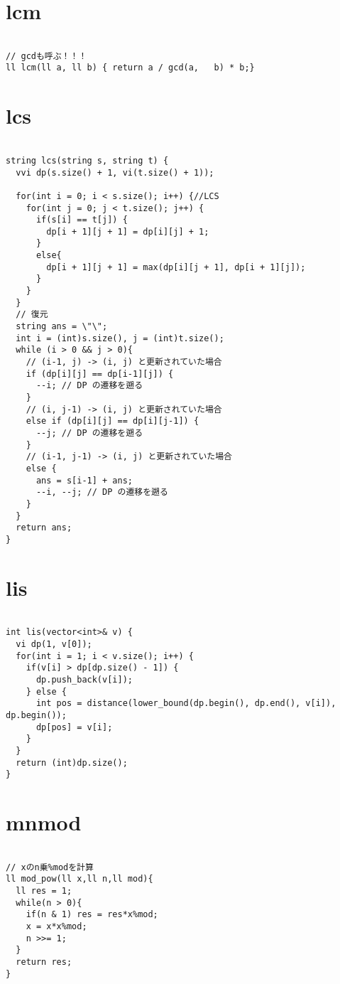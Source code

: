 \documentclass[a4j,titlepage]{jarticle} %
\begin{document}
\color{white}
\section{lcm}
\color{black}
\begin{lstlisting}[caption=lcm]

// gcdも呼ぶ！！！
ll lcm(ll a, ll b) { return a / gcd(a,   b) * b;}

\end{lstlisting}

\color{white}
\section{lcs}
\color{black}
\begin{lstlisting}[caption=lcs]

string lcs(string s, string t) {
  vvi dp(s.size() + 1, vi(t.size() + 1));
  
  for(int i = 0; i < s.size(); i++) {//LCS
    for(int j = 0; j < t.size(); j++) {
      if(s[i] == t[j]) {
        dp[i + 1][j + 1] = dp[i][j] + 1;
      }
      else{
        dp[i + 1][j + 1] = max(dp[i][j + 1], dp[i + 1][j]);
      }
    }
  }
  // 復元
  string ans = \"\";
  int i = (int)s.size(), j = (int)t.size();
  while (i > 0 && j > 0){
    // (i-1, j) -> (i, j) と更新されていた場合
    if (dp[i][j] == dp[i-1][j]) {
      --i; // DP の遷移を遡る
    }
    // (i, j-1) -> (i, j) と更新されていた場合
    else if (dp[i][j] == dp[i][j-1]) {
      --j; // DP の遷移を遡る
    }
    // (i-1, j-1) -> (i, j) と更新されていた場合
    else {
      ans = s[i-1] + ans;
      --i, --j; // DP の遷移を遡る
    }
  }
  return ans;
}

\end{lstlisting}

\color{white}
\section{lis}
\color{black}
\begin{lstlisting}[caption=lis]

int lis(vector<int>& v) {
  vi dp(1, v[0]);
  for(int i = 1; i < v.size(); i++) {
    if(v[i] > dp[dp.size() - 1]) {
      dp.push_back(v[i]);
    } else {
      int pos = distance(lower_bound(dp.begin(), dp.end(), v[i]), dp.begin());
      dp[pos] = v[i];
    }
  }
  return (int)dp.size();
}

\end{lstlisting}

\color{white}
\section{mnmod}
\color{black}
\begin{lstlisting}[caption=mnmod]

// xのn乗%modを計算
ll mod_pow(ll x,ll n,ll mod){
  ll res = 1;
  while(n > 0){
    if(n & 1) res = res*x%mod;
    x = x*x%mod;
    n >>= 1;
  }
  return res;
}

\end{lstlisting}
\end{document}
